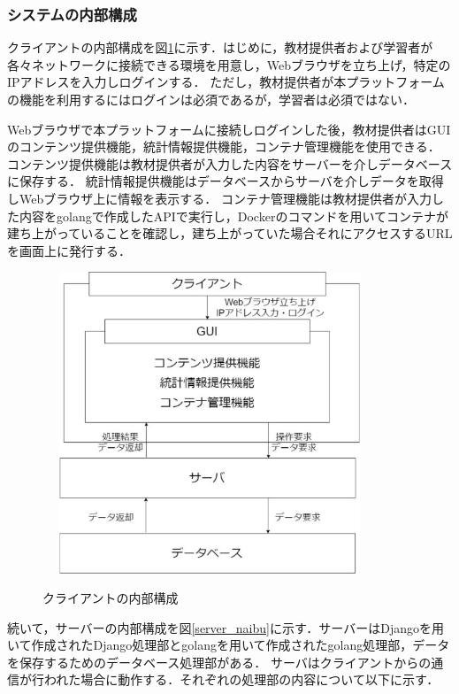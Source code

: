 \subsubsection{システムの内部構成}
クライアントの内部構成を図\ref{client_naibu}に示す．はじめに，教材提供者および学習者が各々ネットワークに接続できる環境を用意し，Webブラウザを立ち上げ，特定のIPアドレスを入力しログインする．
ただし，教材提供者が本プラットフォームの機能を利用するにはログインは必須であるが，学習者は必須ではない．

Webブラウザで本プラットフォームに接続しログインした後，教材提供者はGUIのコンテンツ提供機能，統計情報提供機能，コンテナ管理機能を使用できる．
コンテンツ提供機能は教材提供者が入力した内容をサーバーを介しデータベースに保存する．
統計情報提供機能はデータベースからサーバを介しデータを取得しWebブラウザ上に情報を表示する．
コンテナ管理機能は教材提供者が入力した内容をgolangで作成したAPIで実行し，Dockerのコマンドを用いてコンテナが建ち上がっていることを確認し，建ち上がっていた場合それにアクセスするURLを画面上に発行する．

\begin{figure}[htbp]
    \begin{center}
        \includegraphics[width=10cm,height=9cm,keepaspectratio]{client_arch-crop.pdf}\\
    \end{center}
    \caption{クライアントの内部構成}
    \label{client_naibu}
\end{figure}

続いて，サーバーの内部構成を図\ref{server_naibu}に示す．サーバーはDjangoを用いて作成されたDjango処理部とgolangを用いて作成されたgolang処理部，データを保存するためのデータベース処理部がある．
サーバはクライアントからの通信が行われた場合に動作する．それぞれの処理部の内容について以下に示す．

